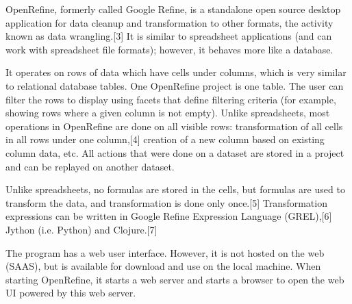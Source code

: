 OpenRefine, formerly called Google Refine, is a standalone open source desktop application for data cleanup and transformation to other formats, the activity known as data wrangling.[3] It is similar to spreadsheet applications (and can work with spreadsheet file formats); however, it behaves more like a database.

It operates on rows of data which have cells under columns, which is very similar to relational database tables. One OpenRefine project is one table. The user can filter the rows to display using facets that define filtering criteria (for example, showing rows where a given column is not empty). Unlike spreadsheets, most operations in OpenRefine are done on all visible rows: transformation of all cells in all rows under one column,[4] creation of a new column based on existing column data, etc. All actions that were done on a dataset are stored in a project and can be replayed on another dataset.

Unlike spreadsheets, no formulas are stored in the cells, but formulas are used to transform the data, and transformation is done only once.[5] Transformation expressions can be written in Google Refine Expression Language (GREL),[6] Jython (i.e. Python) and Clojure.[7]

The program has a web user interface. However, it is not hosted on the web (SAAS), but is available for download and use on the local machine. When starting OpenRefine, it starts a web server and starts a browser to open the web UI powered by this web server.
